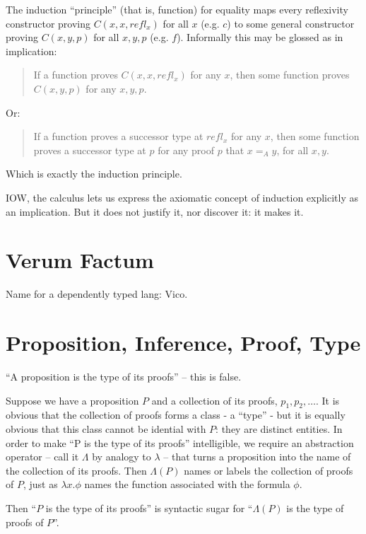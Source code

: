 \documentclass{article}
\begin{document}
The induction ``principle'' (that is, function) for equality maps every
reflexivity constructor proving \(C(x,x,refl_x)\) for all \(x\)
(e.g. \(c\)) to some general constructor proving \(C(x,y,p)\) for all
\(x,y,p\) (e.g. \(f\)).  Informally this may be glossed as in
implication:

\begin{quote}
  If a function proves \(C(x,x,refl_x)\) for any \(x\), then some
  function proves \(C(x,y,p)\) for any \(x,y,p\).
\end{quote}

\noindent Or:
\begin{quote}
  If a function proves a successor type at \(refl_x\) for any \(x\),
  then some function proves a successor type at \(p\) for any proof
  \(p\) that \(x=_Ay\), for all \(x,y\).
\end{quote}

Which is exactly the induction principle.

IOW, the calculus lets us express the axiomatic concept of induction
explicitly as an implication.  But it does not justify it, nor
discover it: it makes it.

\section{Verum Factum}

Name for a dependently typed lang:  Vico.

\section{Proposition, Inference, Proof, Type}

``A proposition is the type of its proofs'' -- this is false.

Suppose we have a proposition \(P\) and a collection of its proofs,
\(p_1, p_2,\ldots\).  It is obvious that the collection of proofs
forms a class - a ``type'' - but it is equally obvious that this class
cannot be idential with \(P\): they are distinct entities.  In order
to make ``P is the type of its proofs'' intelligible, we require an
abstraction operator -- call it \(\Lambda\) by analogy to \(\lambda\) --
that turns a proposition into the name of the collection of its
proofs.  Then \(\Lambda(P)\) names or labels the collection of proofs
of \(P\), just as \(\lambda x.\phi\) names the function associated
with the formula \(\phi\).

Then ``\(P\) is the type of its proofs'' is syntactic sugar for
``\(\Lambda(P)\) is the type of proofs of \(P\)''.
\end{document}
